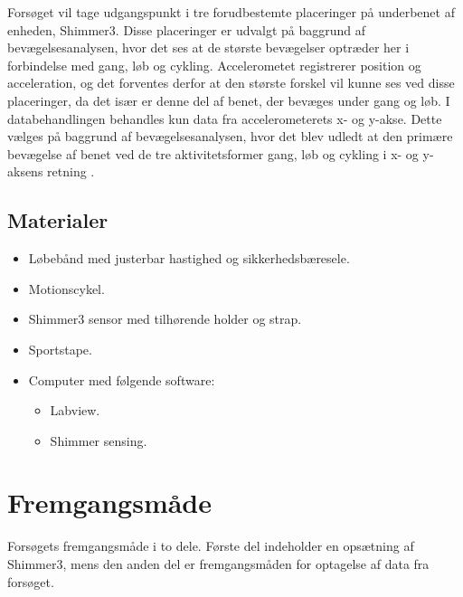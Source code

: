 
Forsøget vil tage udgangspunkt i tre forudbestemte placeringer på underbenet af enheden, Shimmer3. Disse placeringer er udvalgt på baggrund af bevægelsesanalysen, hvor det ses at de største bevægelser optræder her i forbindelse med gang, løb og cykling. Accelerometet registrerer position og acceleration, og det forventes derfor at den største forskel vil kunne ses ved disse placeringer, da det især er denne del af benet, der bevæges under gang og løb. I databehandlingen behandles kun data fra accelerometerets x- og y-akse. Dette vælges på baggrund af bevægelsesanalysen, hvor det blev udledt at den primære bevægelse af  benet ved de tre aktivitetsformer gang, løb og cykling i x- og y-aksens retning \citep{kilde}. 
 

\subsection{Materialer}
\begin{itemize}
	\item Løbebånd med justerbar hastighed og sikkerhedsbæresele.
	\item Motionscykel.
	\item Shimmer3 sensor med tilhørende holder og strap.
	\item Sportstape.
	\item Computer med følgende software:
	\begin{itemize}
		\item Labview.
		\item Shimmer sensing.
	\end{itemize}
\end{itemize}

\section{Fremgangsmåde}
Forsøgets fremgangsmåde i to dele. Første del indeholder en opsætning af Shimmer3, mens den anden del er fremgangsmåden for optagelse af data fra forsøget.

